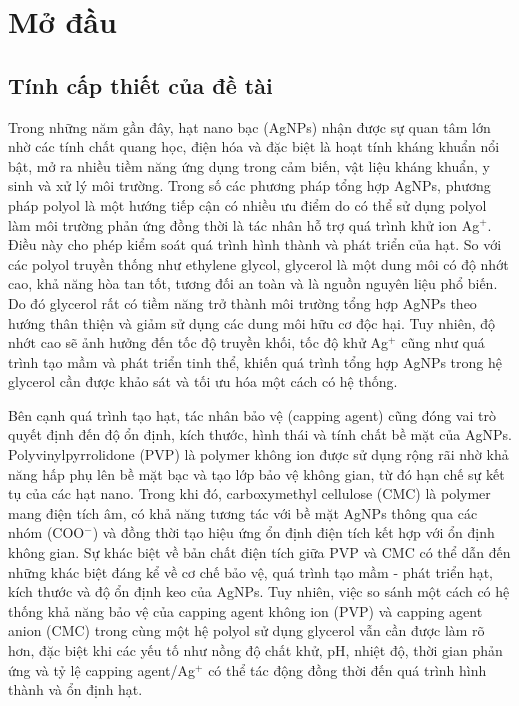\chapter{Mở đầu}

\section{Tính cấp thiết của đề tài}
Trong những năm gần đây, hạt nano bạc (AgNPs) nhận được sự quan tâm lớn nhờ các tính chất quang học, điện hóa và đặc biệt là hoạt tính kháng khuẩn nổi bật, mở ra nhiều tiềm năng ứng dụng trong cảm biến, vật liệu kháng khuẩn, y sinh và xử lý môi trường.
Trong số các phương pháp tổng hợp AgNPs, phương pháp polyol là một hướng tiếp cận có nhiều ưu điểm do có thể sử dụng polyol làm môi trường phản ứng đồng thời là tác nhân hỗ trợ quá trình khử ion Ag$^+$. 
Điều này cho phép kiểm soát quá trình hình thành và phát triển của hạt.
So với các polyol truyền thống như ethylene glycol, glycerol là một dung môi có độ nhớt cao, khả năng hòa tan tốt, tương đối an toàn và là nguồn nguyên liệu phổ biến. 
Do đó glycerol rất có tiềm năng trở thành môi trường tổng hợp AgNPs theo hướng thân thiện và giảm sử dụng các dung môi hữu cơ độc hại.
Tuy nhiên, độ nhớt cao sẽ ảnh hưởng đến tốc độ truyền khối, tốc độ khử Ag$^+$ cũng như quá trình tạo mầm và phát triển tinh thể, khiến quá trình tổng hợp AgNPs trong hệ glycerol cần được khảo sát và tối ưu hóa một cách có hệ thống.
\par
Bên cạnh quá trình tạo hạt, tác nhân bảo vệ (capping agent) cũng đóng vai trò quyết định đến độ ổn định, kích thước, hình thái và tính chất bề mặt của AgNPs.
Polyvinylpyrrolidone (PVP) là polymer không ion được sử dụng rộng rãi nhờ khả năng hấp phụ lên bề mặt bạc và tạo lớp bảo vệ không gian, từ đó hạn chế sự kết tụ của các hạt nano.
Trong khi đó, carboxymethyl cellulose (CMC) là polymer mang điện tích âm, có khả năng tương tác với bề mặt AgNPs thông qua các nhóm (COO$^-$) và đồng thời tạo hiệu ứng ổn định điện tích kết hợp với ổn định không gian.
Sự khác biệt về bản chất điện tích giữa PVP và CMC có thể dẫn đến những khác biệt đáng kể về cơ chế bảo vệ, quá trình tạo mầm - phát triển hạt, kích thước và độ ổn định keo của AgNPs.
Tuy nhiên, việc so sánh một cách có hệ thống khả năng bảo vệ của capping agent không ion (PVP) và capping agent anion (CMC) trong cùng một hệ polyol sử dụng glycerol vẫn cần được làm rõ hơn, đặc biệt khi các yếu tố như nồng độ chất khử, pH, nhiệt độ, thời gian phản ứng và tỷ lệ capping agent/Ag$^+$ có thể tác động đồng thời đến quá trình hình thành và ổn định hạt.

